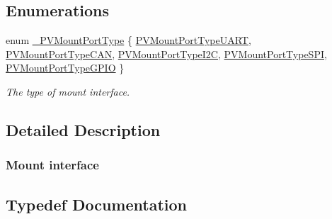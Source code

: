 \subsection*{Enumerations}
\begin{DoxyCompactItemize}
\item 
enum \hyperlink{group___p_v_s_d_k___c_o_r_e___a_p_i___m_o_u_n_t_c_o_n_t_r_o_l_ga67965dabe94c922db72b3ad1f4113b27}{\+\_\+\+P\+V\+Mount\+Port\+Type} \{ \newline
\hyperlink{group___p_v_s_d_k___c_o_r_e___a_p_i___m_o_u_n_t_c_o_n_t_r_o_l_gga67965dabe94c922db72b3ad1f4113b27a0709c22a5f022882862e929abea3bd82}{P\+V\+Mount\+Port\+Type\+U\+A\+RT}, 
\hyperlink{group___p_v_s_d_k___c_o_r_e___a_p_i___m_o_u_n_t_c_o_n_t_r_o_l_gga67965dabe94c922db72b3ad1f4113b27a54ae99e6244ddeddb9e01ff42990cf6b}{P\+V\+Mount\+Port\+Type\+C\+AN}, 
\hyperlink{group___p_v_s_d_k___c_o_r_e___a_p_i___m_o_u_n_t_c_o_n_t_r_o_l_gga67965dabe94c922db72b3ad1f4113b27ac29a1c56b149b19751af2bf5e66cc31f}{P\+V\+Mount\+Port\+Type\+I2C}, 
\hyperlink{group___p_v_s_d_k___c_o_r_e___a_p_i___m_o_u_n_t_c_o_n_t_r_o_l_gga67965dabe94c922db72b3ad1f4113b27a6a2621b9b168007dd5d81232488a557a}{P\+V\+Mount\+Port\+Type\+S\+PI}, 
\newline
\hyperlink{group___p_v_s_d_k___c_o_r_e___a_p_i___m_o_u_n_t_c_o_n_t_r_o_l_gga67965dabe94c922db72b3ad1f4113b27a867cb8f9f9b80c62a70cce728e1c84d4}{P\+V\+Mount\+Port\+Type\+G\+P\+IO}
 \}\begin{DoxyCompactList}\small\item\em The type of mount interface. \end{DoxyCompactList}
\end{DoxyCompactItemize}


\subsection{Detailed Description}
\hypertarget{mount-page}{}\subsubsection{Mount interface}\label{mount-page}


\subsection{Typedef Documentation}
\mbox{\label{group___p_v_s_d_k___c_o_r_e___a_p_i___m_o_u_n_t_c_o_n_t_r_o_l_ga5a1de33b230662127568783314b4a54d}} 

